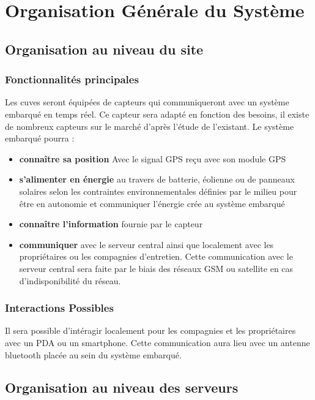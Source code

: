 \section{Organisation Générale du Système}

\subsection{Organisation au niveau du site}

\subsubsection{Fonctionnalités principales}
Les cuves seront équipées de capteurs qui communiqueront avec un système
embarqué en temps réel. Ce capteur sera adapté en fonction des besoins, il
existe de nombreux capteurs sur le marché d'après l'étude de l'existant. Le
système embarqué pourra : 

\begin{itemize}
\item \textbf{connaître sa position} Avec le signal GPS reçu avec son module GPS
\item \textbf{s'alimenter en énergie} au travers de batterie, éolienne ou
de panneaux solaires selon les contraintes environnementales définies par
le milieu pour être en autonomie et communiquer l'énergie crée au système
embarqué
\item \textbf{connaître l'information} fournie par le capteur
\item \textbf{communiquer} avec le serveur central ainsi que localement
avec les propriétaires ou les compagnies d'entretien. Cette communication
avec le serveur central sera faite par le biais des réseaux GSM ou
satellite en cas d'indisponibilité du réseau.
\end{itemize}

\subsubsection{Interactions Possibles}

Il sera possible d'intéragir localement pour les compagnies et les
propriétaires avec un PDA ou un smartphone. Cette communication aura lieu
avec un antenne bluetooth placée au sein du système embarqué.


\subsection{Organisation au niveau des serveurs}


